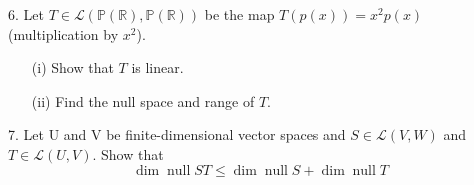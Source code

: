 \documentclass{article}
\theoremstyle{remark} %
\newcommand{\R}{{\mathbb{R}}}
\newcommand{\cL}{{\mathcal{L}}}
\DeclareMathOperator{\nullspace}{null}
\begin{document}
6. Let $T \in \cL(\mathbb{P}(\R),\mathbb{P}(\R))$ be the map $T (p(x))= x^2 p(x)$ (multiplication by $x^2$). 
\begin{enumerate}
    \item[(i)] Show that $T$ is linear.
    \item[(ii)] Find the null space and range of $T$.
\end{enumerate}

\vspace{11cm} %




7. Let U and V be finite-dimensional vector spaces and $S \in \mathcal{L}(V,W)$ and $T \in \mathcal{L}(U,V)$. Show that 
\begin{equation*}
    \dim \nullspace ST \leq \dim \nullspace S + \dim \nullspace T
\end{equation*}
\vspace{11cm} %

\end{document}
